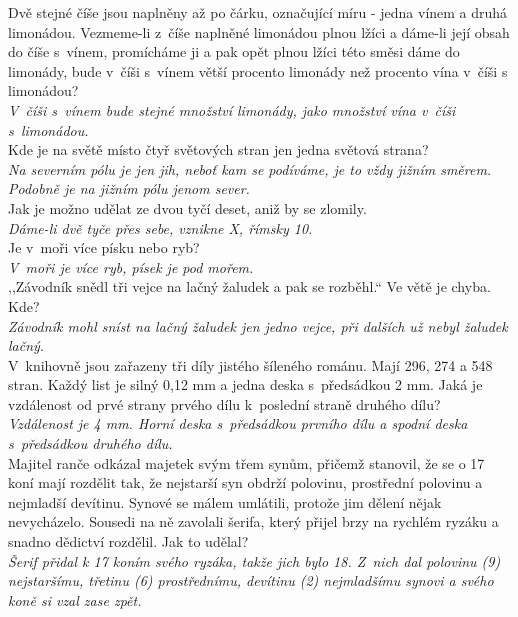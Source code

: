 \begin{multicols}{2}
\noindent
Dvě stejné číše jsou naplněny až po čárku, označující 
míru - jedna vínem a druhá limonádou. Vezmeme-li z~číše 
naplněné limonádou plnou lžíci a dáme-li její obsah do číše s~vínem, 
promícháme ji a pak opět plnou lžíci této směsi dáme do limonády, 
bude v~číši s~vínem větší procento limonády než 
procento vína v~číši s limonádou?\\[1 mm]
{\sl V~číši s~vínem bude stejné množství limonády,
jako množství vína v~číši s~limonádou.}\\

\noindent
Kde je na světě místo čtyř světových stran jen jedna 
světová strana?\\[1 mm]
{\sl Na severním pólu je jen jih, neboť kam se podíváme, je to 
vždy jižním směrem. Podobně je na jižním pólu jenom sever.}\\

\noindent
Jak je možno udělat ze dvou tyčí deset, aniž by se zlomily.\\[1 mm]
{\sl Dáme-li dvě tyče přes sebe, vznikne X, římsky 10.}\\

\noindent
Je v~moři více písku nebo ryb?\\[1 mm]
{\sl V~moři je více ryb, písek je pod mořem.}\\

\noindent
,,Závodník snědl tři vejce na lačný žaludek a pak se rozběhl.`` 
Ve větě je chyba. Kde?\\[1 mm]
{\sl Závodník mohl sníst na lačný žaludek jen jedno vejce, při
dalších už nebyl žaludek lačný.}\\

\noindent
V~knihovně jsou zařazeny tři díly jistého šíleného 
románu. Mají 296, 274 a 548 stran. Každý list je silný 0,12 mm 
a jedna deska s~předsádkou 2 mm. Jaká je vzdálenost od 
prvé strany prvého dílu k~poslední straně druhého dílu?\\[1 mm]
{\sl Vzdálenost je 4 mm. Horní deska s~předsádkou prvního 
dílu a spodní deska s~předsádkou druhého dílu.}\\

\noindent
Majitel ranče odkázal majetek svým třem synům, přičemž 
stanovil, že se o 17 koní mají rozdělit tak, že nejstarší syn 
obdrží polovinu, prostřední polovinu a nejmladší devítinu. Synové 
se málem umlátili, protože jim dělení nějak nevycházelo. Sousedi 
na ně zavolali šerifa, který přijel brzy na rychlém ryzáku a 
snadno dědictví rozdělil. Jak to udělal?\\[1 mm]
{\sl Šerif přidal k 17 koním svého ryzáka, takže jich bylo 18. 
Z~nich dal polovinu (9) nejstaršímu, třetinu (6) prostřednímu,
devítinu (2) nejmladšímu synovi a svého koně si vzal zase zpět.}\\


\end{multicols}
